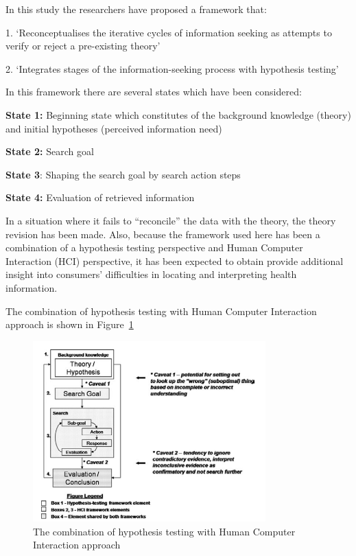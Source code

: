 \documentclass[]{article}
\begin{document}
In this study the researchers have proposed a framework that:

1.	‘Reconceptualises the iterative cycles of information seeking as attempts to verify or reject a pre-existing theory’

2.	‘Integrates stages of the information-seeking process with hypothesis testing’

In this framework there are several states which have been considered:

\textbf{State 1:} Beginning state which constitutes of the background knowledge (theory) and initial hypotheses (perceived information need)

\textbf{State 2:} Search goal

\textbf{State 3}: Shaping the search goal by search action steps

\textbf{State 4:} Evaluation of retrieved information

In a situation where it fails to “reconcile” the data with the theory, the theory revision has been made.
Also, because the framework used here has been a combination of a hypothesis testing perspective and Human Computer Interaction (HCI) perspective, it has been expected to obtain provide additional insight into consumers’ difficulties in locating and interpreting health information. 

The combination of hypothesis testing with Human Computer Interaction approach is shown in Figure~\ref{fig5}  

\begin{figure}[t!]
	\includegraphics[width=0.8\textwidth]{Capture5.png}
	\caption{The combination of hypothesis testing with Human Computer Interaction approach \label{fig5}}
\end{figure}
\end{document}
